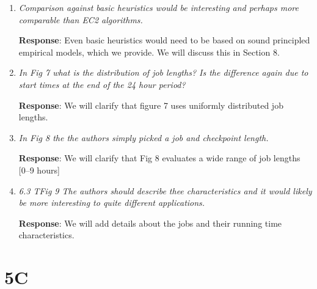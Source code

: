 \documentclass{article}
\newcommand{\resp}[1]{\textbf{Response}: #1}
\begin{document}
\begin{enumerate}
\item \emph{Comparison against basic heuristics would be interesting and perhaps more comparable than EC2 algorithms.}

\resp{Even basic heuristics would need to be based on sound principled empirical models, which we provide. We will discuss this in Section 8.}

\item \emph{In Fig 7 what is the distribution of job lengths? Is the difference again due to start times at the end of the 24 hour period?}

\resp{We will clarify that figure 7 uses uniformly distributed job lengths.}


\item \emph{In Fig 8 the the authors simply picked a job and checkpoint length.}

\resp{We will clarify that Fig 8 evaluates a wide range of job lengths [0--9 hours]}


\item \emph{6.3 TFig 9 The authors should describe thee characteristics and it would likely be more interesting to quite different applications.}

\resp{We will add details about the jobs and their running time characteristics.}


\end{enumerate}

\section{5C}
\end{document}
